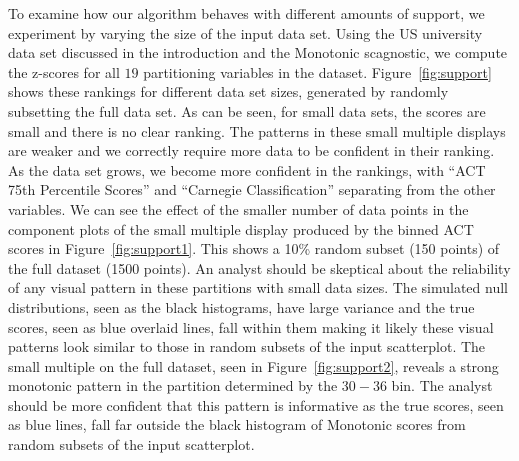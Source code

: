 To examine how our algorithm behaves with different amounts of support, we experiment by varying the size of the input data set. Using the US university data set discussed in the introduction and the Monotonic scagnostic, we compute the z-scores for all $19$ partitioning variables in the dataset. Figure~\ref{fig:support} shows these rankings for different data set sizes, generated by randomly subsetting the full data set.
As can be seen, for small data sets, the scores are small and there is no clear ranking. The patterns in these small multiple displays are weaker and we correctly require more data to be confident in their ranking. As the data set grows, we become more confident in the rankings, with ``ACT 75th Percentile Scores'' and ``Carnegie Classification'' separating from the other variables. 
We can see the effect of the smaller number of data points in the component plots of the small multiple display produced by the binned ACT scores in Figure~\ref{fig:support1}. This shows a 10\% random subset (150 points) of the full dataset (1500 points). An analyst should be skeptical about the reliability of any visual pattern in these partitions with small data sizes. The simulated null distributions, seen as the black histograms, have large variance and the true scores, seen as blue overlaid lines, fall within them making it likely these visual patterns look similar to those in random subsets of the input scatterplot.
The small multiple on the full dataset, seen in Figure~\ref{fig:support2}, reveals a strong monotonic pattern in the partition determined by the $30-36$ bin. The analyst should be more confident that this pattern is informative as the true scores, seen as blue lines, fall far outside the black histogram of Monotonic scores from random subsets of the input scatterplot.

